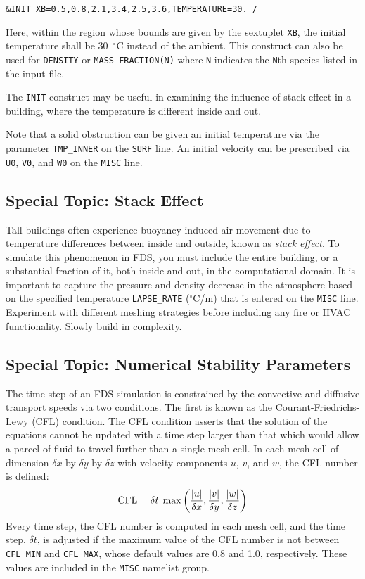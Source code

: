 \documentclass[11pt]{book}
\newcommand{\ct}{\tt\small}
\newcommand{\dx}{\delta x}
\newcommand{\dy}{\delta y}
\newcommand{\dz}{\delta z}
\newcommand{\dt}{\delta t}
\newcommand{\hu}{u}
\newcommand{\hv}{v}
\newcommand{\hw}{w}
\newcommand{\be}{\begin{equation}}
\newcommand{\ee}{\end{equation}}
\begin{document}
\footnotesize
\begin{verbatim}
&INIT XB=0.5,0.8,2.1,3.4,2.5,3.6,TEMPERATURE=30. /
\end{verbatim}

\normalsize
Here, within the region whose bounds are given by the sextuplet {\ct XB},
the initial temperature shall be 30~$^\circ$C instead of the ambient.
This construct can also be used for {\ct DENSITY} or
{\ct MASS\_FRACTION(N)} where {\ct N} indicates the {\ct N}th species listed in the input file.

The {\ct INIT} construct may be useful in examining the influence of
stack effect  in a building, where the temperature
is different inside and out.

Note that a solid obstruction can be given an initial temperature via the
parameter {\ct TMP\_INNER} on the {\ct SURF} line. An initial velocity
can be prescribed via {\ct U0}, {\ct V0}, and {\ct W0} on the {\ct MISC} line.


\subsection{Special Topic: Stack Effect}
\label{info:stackeffect} 

Tall buildings often experience buoyancy-induced air movement due to temperature differences
between inside and outside, known as {\em stack effect}. To simulate this phenomenon in FDS, you must
include the entire building, or a substantial fraction of it, both inside and out, in the computational domain. It
is important to capture the pressure and density decrease in the atmosphere based on the specified
temperature {\ct LAPSE\_RATE} ($^\circ$C/m) that is entered on the {\ct MISC} line. Experiment with different meshing
strategies before including any fire or HVAC  functionality. Slowly build in complexity.


\subsection{Special Topic: Numerical Stability Parameters}
\label{info:CFL}

The time step of an FDS simulation is constrained by the convective and diffusive
transport speeds via two conditions. The first is known as the
Courant-Friedrichs-Lewy (CFL) condition. The CFL condition asserts that the solution of the equations cannot be updated with a time step
larger than that which would allow a parcel of fluid to travel further than a single mesh cell.
In each mesh cell of dimension $\dx$ by $\dy$ by $\dz$ with velocity
components $u$, $v$, and $w$, the CFL number is defined:
\be \hbox{CFL} = \dt \; \max \left(\frac{|\hu|}{\dx},\frac{|\hv|}{\dy},\frac{|\hw|}{\dz} \right)   \label{cfl}
\ee
Every time step, the CFL number is computed in each mesh cell, and the time step, $\dt$, is adjusted if the
maximum value of the CFL number is not between {\ct CFL\_MIN} and {\ct CFL\_MAX}, whose default values are
0.8 and 1.0, respectively. These values are included in the {\ct MISC} namelist group.
\end{document}
